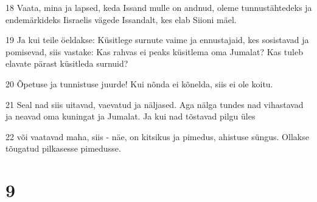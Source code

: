 \par 18 Vaata, mina ja lapsed, keda Issand mulle on andnud, oleme tunnustähtedeks ja endemärkideks Iisraelis vägede Issandalt, kes elab Siioni mäel.
\par 19 Ja kui teile öeldakse: Küsitlege surnute vaime ja ennustajaid, kes sosistavad ja pomisevad, siis vastake: Kas rahvas ei peaks küsitlema oma Jumalat? Kas tuleb elavate pärast küsitleda surnuid?
\par 20 Õpetuse ja tunnistuse juurde! Kui nõnda ei kõnelda, siis ei ole koitu.
\par 21 Seal nad siis uitavad, vaevatud ja näljased. Aga nälga tundes nad vihastavad ja neavad oma kuningat ja Jumalat. Ja kui nad tõstavad pilgu üles
\par 22 või vaatavad maha, siis - näe, on kitsikus ja pimedus, ahistuse süngus. Ollakse tõugatud pilkasesse pimedusse.

\chapter{9}

